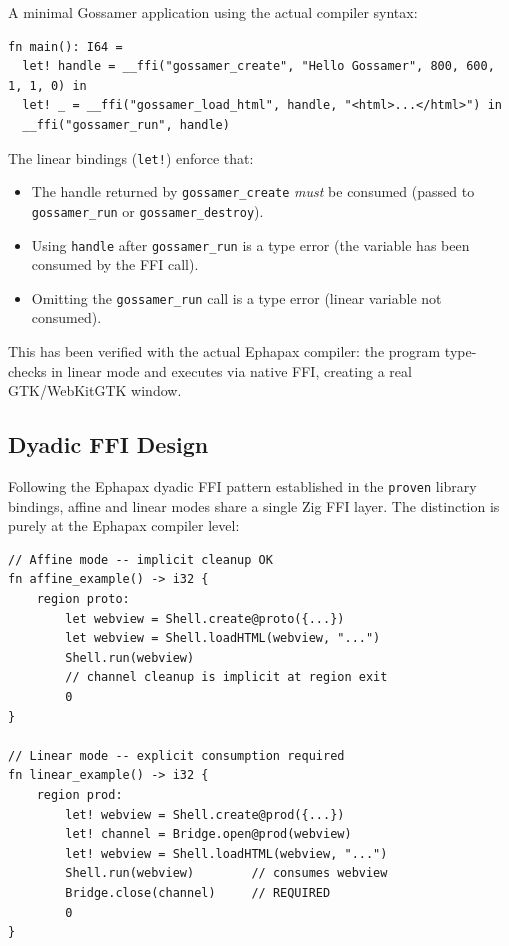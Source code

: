 \documentclass[11pt,a4paper]{article}
\theoremstyle{definition}
\begin{document}
A minimal Gossamer application using the actual compiler syntax:

\begin{lstlisting}[style=ephapax]
fn main(): I64 =
  let! handle = __ffi("gossamer_create", "Hello Gossamer", 800, 600, 1, 1, 0) in
  let! _ = __ffi("gossamer_load_html", handle, "<html>...</html>") in
  __ffi("gossamer_run", handle)
\end{lstlisting}

The linear bindings (\texttt{let!}) enforce that:
\begin{itemize}[nosep]
  \item The handle returned by \texttt{gossamer\_create} \emph{must} be
    consumed (passed to \texttt{gossamer\_run} or \texttt{gossamer\_destroy}).
  \item Using \texttt{handle} after \texttt{gossamer\_run} is a type error
    (the variable has been consumed by the FFI call).
  \item Omitting the \texttt{gossamer\_run} call is a type error (linear
    variable not consumed).
\end{itemize}

This has been verified with the actual Ephapax compiler: the program
type-checks in linear mode and executes via native FFI, creating a real
GTK/WebKitGTK window.

\subsection{Dyadic FFI Design}

Following the Ephapax dyadic FFI pattern established in the
\texttt{proven} library bindings, affine and linear modes share a
single Zig FFI layer. The distinction is purely at the Ephapax
compiler level:

\begin{lstlisting}[style=ephapax]
// Affine mode -- implicit cleanup OK
fn affine_example() -> i32 {
    region proto:
        let webview = Shell.create@proto({...})
        let webview = Shell.loadHTML(webview, "...")
        Shell.run(webview)
        // channel cleanup is implicit at region exit
        0
}

// Linear mode -- explicit consumption required
fn linear_example() -> i32 {
    region prod:
        let! webview = Shell.create@prod({...})
        let! channel = Bridge.open@prod(webview)
        let! webview = Shell.loadHTML(webview, "...")
        Shell.run(webview)        // consumes webview
        Bridge.close(channel)     // REQUIRED
        0
}
\end{lstlisting}
\end{document}
